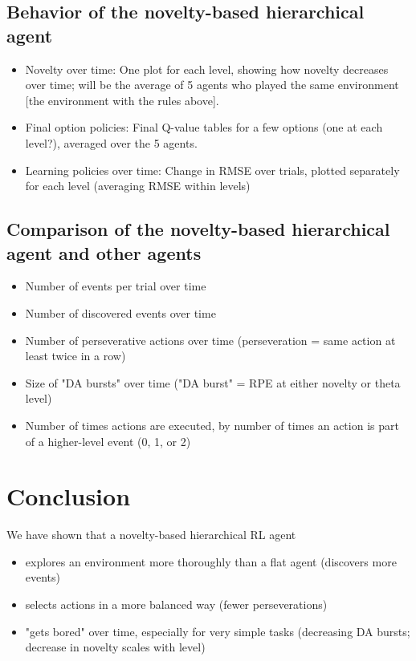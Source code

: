 \documentclass{article}
\begin{document}
\subsection{Behavior of the novelty-based hierarchical agent}

\begin{itemize}
	\item Novelty over time: One plot for each level, showing how novelty decreases over time; will be the average of 5 agents who played the same environment [the environment with the rules above].
	\item Final option policies: Final Q-value tables for a few options (one at each level?), averaged over the 5 agents.
	\item Learning policies over time: Change in RMSE over trials, plotted separately for each level (averaging RMSE within levels)
\end{itemize}

\subsection{Comparison of the novelty-based hierarchical agent and other agents}

\begin{itemize}
	\item Number of events per trial over time
	\item Number of discovered events over time
	\item Number of perseverative actions over time (perseveration = same action at least twice in a row)
	\item Size of "DA bursts" over time ("DA burst" = RPE at either novelty or theta level)
	\item Number of times actions are executed, by number of times an action is part of a higher-level event (0, 1, or 2)
\end{itemize}

\section{Conclusion}

We have shown that a novelty-based hierarchical RL agent
\begin{itemize}
	\item explores an environment more thoroughly than a flat agent (discovers more events)
	\item selects actions in a more balanced way (fewer perseverations)
	\item "gets bored" over time, especially  for very simple tasks (decreasing DA bursts; decrease in novelty scales with level)
\end{itemize}
\end{document}

